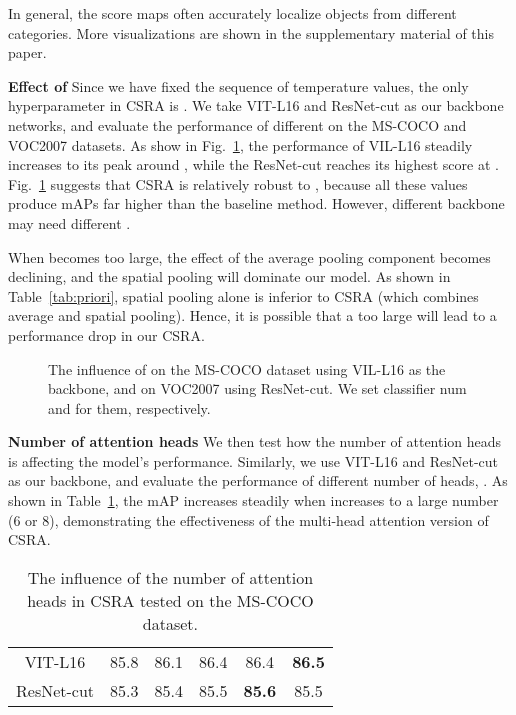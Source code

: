 \documentclass[10pt,twocolumn,letterpaper]{article}
\begin{document}
In general, the score maps often accurately localize objects from different categories. More visualizations are shown in the supplementary material of this paper.

\vspace{6pt}\noindent\textbf{Effect of } Since we have fixed the sequence of temperature values, the only hyperparameter in CSRA is . We take VIT-L16 and ResNet-cut as our backbone networks, and evaluate the performance of different  on the MS-COCO and VOC2007 datasets. As show in Fig.~\ref{fig:lam}, the performance of VIL-L16 steadily increases to its peak around , while the ResNet-cut reaches its highest score at . Fig.~\ref{fig:lam} suggests that CSRA is relatively robust to , because all these  values produce mAPs far higher than the baseline method. However, different backbone may need different .

When  becomes too large, the effect of the average pooling component becomes declining, and the spatial pooling will dominate our model. As shown in Table~\ref{tab:priori}, spatial pooling alone is inferior to CSRA (which combines average and spatial pooling). Hence, it is possible that a too large  will lead to a performance drop in our CSRA.

\begin{figure}
	\centering
	\caption{The influence of  on the MS-COCO dataset using VIL-L16 as the backbone, and on VOC2007 using ResNet-cut. We set classifier num  and  for them, respectively.}
	\label{fig:lam}
\end{figure}

\vspace{6pt}\noindent\textbf{Number of attention heads} We then test how the number of attention heads is affecting the model's performance. Similarly, we use VIT-L16 and ResNet-cut as our backbone, and evaluate the performance of different number of heads, . As shown in Table~\ref{tab:head}, the mAP increases steadily when  increases to a large number (6 or 8), demonstrating the effectiveness of the multi-head attention version of CSRA.

\begin{table}
	\caption{The influence of the number of attention heads in CSRA tested on the MS-COCO dataset.}
	\label{tab:head}
	\centering
	\small
	\setlength{\tabcolsep}{3.2pt}
	\begin{tabular}{c|ccccc}
		\hline
		           &  &  &  &          &          \\ \hline \hline
		VIT-L16    & 85.8  & 86.1  & 86.4  & 86.4          & \textbf{86.5} \\ \hline
		ResNet-cut & 85.3  & 85.4  & 85.5  & \textbf{85.6} & 85.5          \\ \hline
	\end{tabular}
\end{table}
\end{document}
